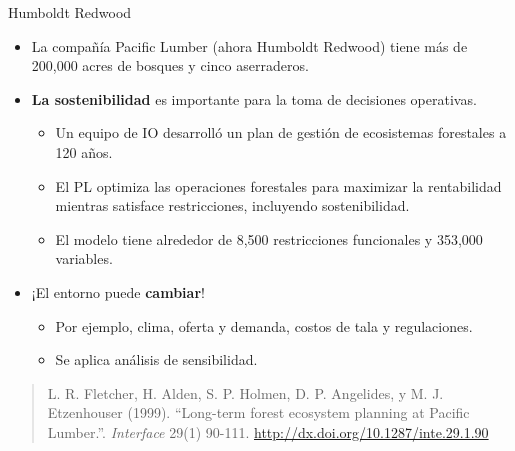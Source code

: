 \documentclass{beamer}
\begin{document}
\begin{frame}{Humboldt Redwood}
    \begin{itemize}
        \item La compañía Pacific Lumber (ahora Humboldt Redwood) tiene más de 200,000 acres de bosques y cinco aserraderos.
    \end{itemize}
    
    \begin{itemize}
        \item \textbf{La sostenibilidad} es importante para la toma de decisiones operativas.
        \begin{itemize}
            \item Un equipo de IO desarrolló un plan de gestión de ecosistemas forestales a 120 años.
            \item El PL optimiza las operaciones forestales para maximizar la rentabilidad mientras satisface restricciones, incluyendo sostenibilidad.
            \item El modelo tiene alrededor de 8,500 restricciones funcionales y 353,000 variables.
        \end{itemize}
    \end{itemize}
    
    \begin{itemize}
        \item ¡El entorno puede \textbf{cambiar}!
        \begin{itemize}
            \item Por ejemplo, clima, oferta y demanda, costos de tala y regulaciones.
            \item Se aplica análisis de sensibilidad.
        \end{itemize}
    \end{itemize}
    
    \vspace{1cm}
    \footnotesize{
        \begin{quote}
            L. R. Fletcher, H. Alden, S. P. Holmen, D. P. Angelides, y M. J. Etzenhouser (1999). “Long-term forest ecosystem planning at Pacific Lumber.”. \textit{Interface} 29(1) 90-111. \url{http://dx.doi.org/10.1287/inte.29.1.90}
        \end{quote}
    }
\end{frame}
\end{document}
